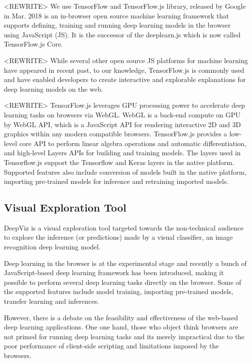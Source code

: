 <REWRITE> We use TensorFlow and TensorFlow.js library, released by Google in Mar. 2018 is an in-browser open source machine learning framework that supports defining, training and running deep learning models in the browser using JavaScript (JS). It is the successor of the deeplearn.js which is now called TensorFlow.js Core. 

<REWRITE> While several other open source JS platforms for machine learning have appeared in recent past, to our knowledge, TensorFlow.js is commonly used and have enabled developers to create interactive and explorable explanations for deep learning models on the web.

<REWRITE> TensorFlow.js leverages GPU processing power to accelerate deep learning tasks on browsers via WebGL. WebGL is a back-end compute on GPU by WebGL API, which is a JavaScript API for rendering interactive 2D and 3D graphics within any modern compatible browsers. TensorFlow.js provides a low-level core API to perform linear algebra operations and automatic differentiation, and high-level Layers APIs for building and training models. The layers used in Tensorflow.js support the Tensorflow and Keras layers in the native platform. Supported features also include conversion of models built in the native platform, importing pre-trained models for inference and retraining imported models.

\subsection{Visual Exploration Tool}

DeepViz is a visual exploration tool targeted towards the non-technical audience to explore the inference (or predictions) made by a visual classifier, an image recognition deep learning model.

Deep learning in the browser is at the experimental stage and recently a bunch of JavaScript-based deep learning framework has been introduced, making it possible to perform several deep learning tasks directly on the browser. Some of the supported features include model training, importing pre-trained models, transfer learning and inferences.

However, there is a debate on the feasibility and effectiveness of the web-based deep learning applications. One one hand, those who object think browsers are not primed for running deep learning tasks and its merely impractical due to the poor performance of client-side scripting and limitations imposed by the browsers. 


